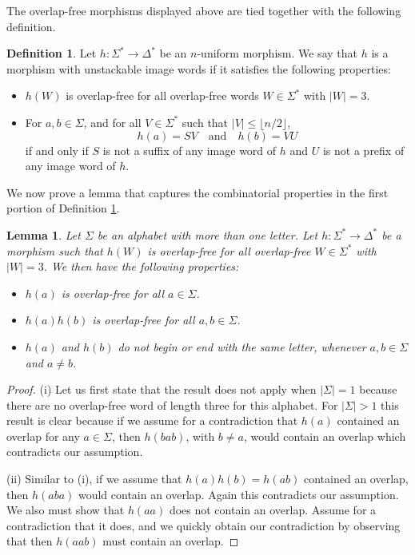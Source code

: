 \documentclass[12pt]{amsart}
\newtheorem{lem}[thm]{Lemma}
\theoremstyle{definition}
\newtheorem{defn}[thm]{Definition}
\theoremstyle{plain}
\theoremstyle{nameit}
\theoremstyle{plain}
\begin{document}
\begin{onehalfspace}
The overlap-free morphisms displayed above are tied together with the following definition.

\begin{defn}
Let $h:\Sigma^*\to\Delta^*$ be an $n$-uniform morphism. We say that $h$ is a morphism with
unstackable image words if it
satisfies the
following properties:
\begin{itemize}
\item[(i)] $h(W)$ is overlap-free for all overlap-free words $W\in\Sigma^*$ with $|W|=3$.
\item[(ii)] For $a,b\in\Sigma$, and for all $V\in\Sigma^*$ such that $|V|\le\lfloor n/2\rfloor$,
\[h(a) = SV\quad\textrm{and}\quad h(b) = VU\]
if and only if $S$ is not a suffix of any image word of $h$ and $U$ is not a prefix of any image word of $h
$.
\end{itemize}
\label{def_5_1}
\end{defn}

We now prove a lemma that captures the combinatorial properties in the first
portion of Definition \ref{def_5_1}.

\begin{lem}
Let $\Sigma$ be an alphabet with more than one letter. Let $h:\Sigma^*\to\Delta^*$ be a morphism such
that $h(W)$ is overlap-free for all overlap-free $W\in
\Sigma^*$ with $|W| = 3$. We then have the following properties:
\begin{itemize}
\item[(i)] $h(a)$ is overlap-free for all $a\in\Sigma$.
\item[(ii)] $h(a)h(b)$ is overlap-free for all $a,b\in\Sigma$.
\item[(iii)] $h(a)$ and $h(b)$ do not begin or end with the same letter, whenever $a,b\in\Sigma$ and $a
\neq b$.
\end{itemize}
\label{lem_5_2}
\end{lem}

\begin{proof}
(i) Let us first state that the result does not apply when $|\Sigma|=1$ because there are no overlap-free
word of length three for this alphabet. For $|\Sigma|>1$ this result is clear because if we assume for a
contradiction that $h(a)$ contained an overlap for
any $a\in\Sigma$, then $h(bab)$, with $b\neq a$, would contain an overlap which contradicts our
assumption.

(ii) Similar to (i), if we assume that $h(a)h(b) =  h(ab)$ contained an overlap, then $h(aba)$ would contain
an overlap. Again this contradicts our assumption. We also must show that $h(aa)$ does not contain an
overlap. Assume for a contradiction that it does, and we quickly obtain our contradiction by observing that
then $h(aab)$ must contain an overlap.


\end{proof}
\end{onehalfspace}
\end{document}
